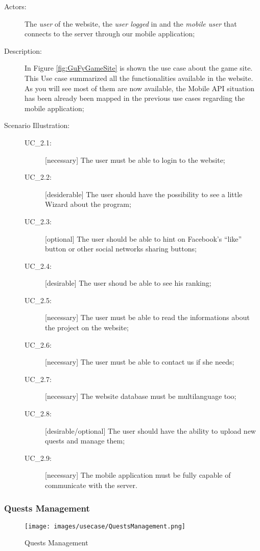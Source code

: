 \begin{description}
	\item[Actors:] The \textit{user} of the website, the \textit{user logged} in and the \textit{mobile user} that connects to the server through our mobile application;
	\item[Description:] In Figure \ref{fig:GuFyGameSite} is shown the use case about the game site. This Use case summarized all the functionalities available in the website. As you will see most of them are now available, the Mobile API situation has been already been mapped in the previous use cases regarding the mobile application;
	\item[Scenario Illustration:]
	
		\begin{description}
			\item[UC\_2.1:] [necessary] The user must be able to login to the website;
			\item[UC\_2.2:] [desiderable] The user should have the possibility to see a little Wizard about the program;
			\item[UC\_2.3:] [optional] The user should be able to hint on Facebook's ``like'' button or other social networks sharing buttons;
			\item[UC\_2.4:] [desirable] The user shoud be able to see his ranking;
			\item[UC\_2.5:] [necessary] The user must be able to read the informations about the project on the website;
			\item[UC\_2.6:] [necessary] The user must be able to contact us if she needs;
			\item[UC\_2.7:] [necessary] The website database must be multilanguage too;
			\item[UC\_2.8:] [desirable/optional] The user should have the ability to upload new quests and manage them;
			\item[UC\_2.9:] [necessary] The mobile application must be fully capable of communicate with the server.
		\end{description}
\end{description}

\subsubsection{Quests Management}
\label{sec:questManagement}
\begin{figure}[H]
\centering %
\texttt{[image: images/usecase/QuestsManagement.png]}
\caption{Quests Management}
\label{fig:Quests Management use case}
\end{figure}

